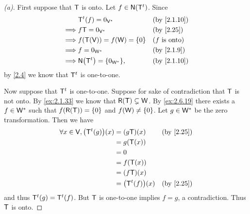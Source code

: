\begin{proof}[(a)]
  First suppose that \(\mathsf{T}\) is onto.
  Let \(f \in \ns{\tp{\T}}\).
  Since
  \begin{align*}
             & \tp{\T}(f) = 0_{\V^*}          &  & \text{(by \cref{2.1.10})} \\
    \implies & f \T = 0_{\V^*}                &  & \text{(by \cref{2.25})}   \\
    \implies & f(\T(\V)) = f(\W) = \set{0}    &  & \text{(\(f\) is onto)}    \\
    \implies & f = 0_{\W^*}                   &  & \text{(by \cref{2.1.9})}  \\
    \implies & \ns{\tp{\T}} = \set{0_{\W^*}}, &  & \text{(by \cref{2.1.10})}
  \end{align*}
  by \cref{2.4} we know that \({\mathsf{T}}^{t}\) is one-to-one.

  Now suppose that \({\mathsf{T}}^{t}\) is one-to-one.
  Suppose for sake of contradiction that \(\mathsf{T}\) is not onto.
  By \cref{ex:2.1.33} we know that \(\rg{\T} \subsetneq \W\).
  By \cref{ex:2.6.19} there exists a \(f \in \mathsf{W}^*\) such that \(f(\rg{\T}) = \set{0}\) and \(f(\mathsf{W}) \neq \left\lbrace0\right\rbrace\).
  Let \(g \in \mathsf{W}^*\) be the zero transformation.
  Then we have
  \begin{align*}
    \forall x \in \V, \pa{\tp{\T}(g)}(x) & = (g \T)(x)          &  & \text{(by \cref{2.25})} \\
                                         & = g(\T(x))                                        \\
                                         & = 0                                               \\
                                         & = f(\T(x))                                        \\
                                         & = (f \T)(x)                                       \\
                                         & = \pa{\tp{\T}(f)}(x) &  & \text{(by \cref{2.25})}
  \end{align*}
  and thus \({\mathsf{T}}^{t}(g) = {\mathsf{T}}^{t}(f)\).
  But \(\mathsf{T}\) is one-to-one implies \(f = g\), a contradiction.
  Thus \(\mathsf{T}\) is onto.
\end{proof}

